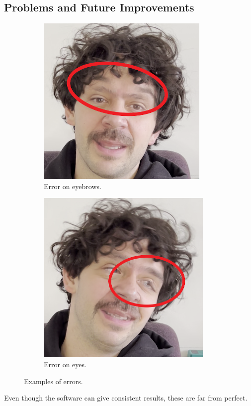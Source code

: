 \documentclass[preprint]{elsarticle}
\begin{document}
\subsection{Problems and Future Improvements}

\begin{figure}[t]
	\centering
	\begin{subfigure}[b]{0.5\textwidth}
		\centering
		\includegraphics[scale=0.4]{img/project_img/error-eyebrows.png}
		\caption{Error on eyebrows.}\label{fig:error-eyebrows}
	\end{subfigure}%
	\hfill
	\begin{subfigure}[b]{0.5\textwidth}
		\centering
		\includegraphics[scale=0.4]{img/project_img/error-eyes.png}
		\caption{Error on eyes.}\label{fig:error-eyes}
	\end{subfigure}
	\caption{Examples of errors.}\label{fig:errors}
\end{figure}
Even though the software can give consistent results, these are far from perfect. 
\end{document}
